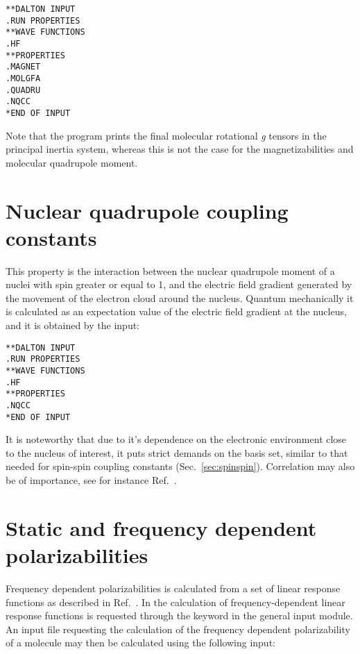\begin{verbatim}
**DALTON INPUT
.RUN PROPERTIES
**WAVE FUNCTIONS
.HF
**PROPERTIES
.MAGNET
.MOLGFA
.QUADRU
.NQCC
*END OF INPUT
\end{verbatim}

Note that the program prints the final molecular rotational {\em g}
tensors in the
principal inertia system, whereas this is not the case for the
magnetizabilities and molecular quadrupole moment.

\section{Nuclear quadrupole coupling constants}

This property is the interaction between the nuclear quadrupole moment
of a nuclei with spin greater or equal to 1, and the electric field gradient
generated by the movement of the electron cloud around the nucleus.
Quantum mechanically it is calculated as an expectation value of the electric
field gradient  at the nucleus, and it is obtained by the input:

\begin{verbatim}
**DALTON INPUT
.RUN PROPERTIES
**WAVE FUNCTIONS
.HF
**PROPERTIES
.NQCC
*END OF INPUT
\end{verbatim}

It is noteworthy that due to it's dependence on the
electronic environment close to the nucleus of interest, it puts strict
demands on the basis set, similar to that needed for spin-spin
coupling
constants (Sec.~\ref{sec:spinspin}). Correlation may also be of
importance, see for instance Ref.~\cite{mjssocpjthkrcpl243}.

\section{Static and frequency dependent
polarizabilities}\label{sec:polari}

Frequency dependent polarizabilities is
calculated from a set of linear
response functions as
described in Ref.~\cite{jopjjcp82}. In {\aba} the
calculation of frequency-dependent linear response functions is
requested through the keyword  in the general input
module. An input file requesting the calculation of the frequency
dependent polarizability of a molecule may then be calculated using
the following input:

